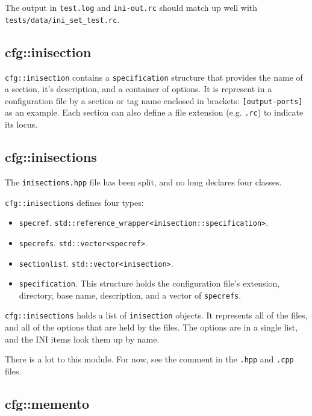    The output in \texttt{test.log} and \texttt{ini-out.rc}
   should match up well with \texttt{tests/data/ini\_set\_test.rc}.

\subsection{cfg::inisection}
\label{subsec:cfg_namespace_inisection}

   \texttt{cfg::inisection}  contains a \texttt{specification} structure that
   provides the name of a section, it's description, and
   a container of options.
   It is represent in a configuration file by a section or tag name
   enclosed in brackets:  \texttt{[output-ports]} as an example.
   Each section can also define a file extension
   (e.g. \texttt{.rc}) to indicate its locus.

\subsection{cfg::inisections}
\label{subsec:cfg_namespace_inisections}

   The \texttt{inisections.hpp} file has been split,
   and no long declares four classes.

   \texttt{cfg::inisections} defines four types:

   \begin{itemize}
      \item \texttt{specref}.
          \texttt{std::reference\_wrapper<inisection::specification>}.
      \item \texttt{specrefs}.
          \texttt{std::vector<specref>}.
      \item \texttt{sectionlist}.
         \texttt{std::vector<inisection>}.
      \item \texttt{specification}.
         This structure holds the configuration file's extension,
         directory, base name, description, and a vector of
         \texttt{specrefs}.
   \end{itemize}

   \texttt{cfg::inisections} holds a list of \texttt{inisection} objects.
   It represents all of the files, and all of
   the options that are held by the files.
   The options are in a single list,
   and the INI items look them up by name.

   There is a lot to this module.
   For now, see the comment in the \texttt{.hpp} and \texttt{.cpp} files.

\subsection{cfg::memento}
\label{subsec:cfg_namespace_memento}

